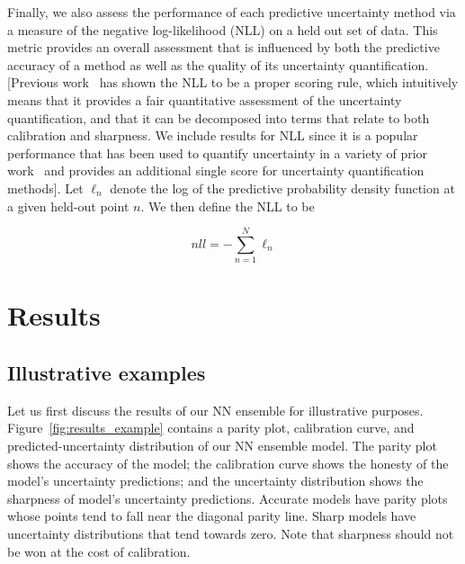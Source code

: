 \documentclass[]{achemso}
\begin{document}
Finally, we also assess the performance of each predictive uncertainty method
via a measure of the negative log-likelihood (NLL) on a held out set of data.
This metric provides an overall assessment that is influenced by both the
predictive accuracy of a method as well as the quality of its uncertainty
quantification.
[Previous work~\cite{} has shown the NLL to be a proper scoring rule, which
intuitively means that it provides a fair quantitative assessment of the
uncertainty quantification, and that it can be decomposed into terms that
relate to both calibration and sharpness. We include results for NLL since it
is a popular performance that has been used to quantify uncertainty in a
variety of prior work~\cite{} and provides an additional single score for
uncertainty quantification methods].
Let $\ell_n$ denote the log of the predictive probability density function at a
given held-out point $n$. We then define the NLL to be

\begin{equation} \label{nll}
  nll = - \sum_{n=1}^{N} \ell_n
\end{equation}



\section{Results}

\subsection{Illustrative examples}

Let us first discuss the results of our \gls{NN} ensemble for illustrative purposes.
Figure~\ref{fig:results_example} contains a parity plot, calibration curve, and predicted-uncertainty distribution of our \gls{NN} ensemble model.
The parity plot shows the accuracy of the model; the calibration curve shows the honesty of the model's uncertainty predictions; and the uncertainty distribution shows the sharpness of model's uncertainty predictions.
Accurate models have parity plots whose points tend to fall near the diagonal parity line.
Sharp models have uncertainty distributions that tend towards zero.
Note that sharpness should not be won at the cost of calibration.
\end{document}
